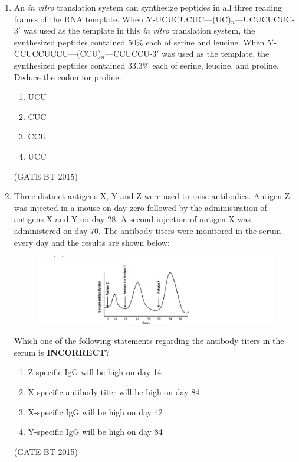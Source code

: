 \documentclass[journal,12pt,onecolumn]{IEEEtran}
\begin{document}
\begin{enumerate}[label=\textbf{Q.\arabic*}]
\item An \textit{in vitro} translation system can synthesize peptides in all three reading frames of the RNA template. 
When 5$'$-UCUCUCUC---(UC)$_n$---UCUCUCUC-3$'$ was used as the template in this \textit{in vitro} translation system, the synthesized peptides contained 50\% each of serine and leucine. 
When 5$'$-CCUCCUCCU---(CCU)$_n$---CCUCCU-3$'$ was used as the template, the synthesized peptides contained 33.3\% each of serine, leucine, and proline. 
Deduce the codon for proline.  

\begin{multicols}{4}
\begin{enumerate}
\item UCU  
\item CUC  
\item CCU  
\item UCC  
\end{enumerate}
\end{multicols}\hfill (GATE BT 2015)



\item Three distinct antigens X, Y and Z were used to raise antibodies. Antigen Z was injected in a mouse on day zero followed by the administration of antigens X and Y on day 28. A second injection of antigen X was administered on day 70. The antibody titers were monitored in the serum every day and the results are shown below:

\begin{figure}[H]
\centering
\includegraphics[width=0.7\columnwidth]{fig 7.png}
\caption{}
\label{fig:antibody}
\end{figure}

Which one of the following statements regarding the antibody titers in the serum is \textbf{INCORRECT}?  


\begin{enumerate}
\item Z-specific IgG will be high on day 14  
\item X-specific antibody titer will be high on day 84  
\item X-specific IgG will be high on day 42  
\item Y-specific IgG will be high on day 84  
\end{enumerate}\hfill (GATE BT 2015)


\end{enumerate}
\end{document}
